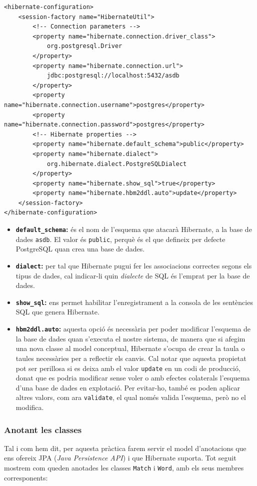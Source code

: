 \begin{verbatim}
<hibernate-configuration>
    <session-factory name="HibernateUtil">
        <!-- Connection parameters -->
        <property name="hibernate.connection.driver_class">
            org.postgresql.Driver
        </property>
        <property name="hibernate.connection.url">
            jdbc:postgresql://localhost:5432/asdb
        </property>
        <property name="hibernate.connection.username">postgres</property>
        <property name="hibernate.connection.password">postgres</property>
        <!-- Hibernate properties -->
        <property name="hibernate.default_schema">public</property>
        <property name="hibernate.dialect">
            org.hibernate.dialect.PostgreSQLDialect
        </property>
        <property name="hibernate.show_sql">true</property>
        <property name="hibernate.hbm2ddl.auto">update</property>
    </session-factory>
</hibernate-configuration>
\end{verbatim}

\begin{itemize}
	\item \textbf{\texttt{default\_schema}:} és el nom de l'esquema que atacarà Hibernate, a la base de dades \texttt{asdb}. El valor és \texttt{public}, perquè és el que defineix per defecte PostgreSQL quan crea una base de dades.
	\item \textbf{\texttt{dialect}:} per tal que Hibernate pugui fer les associacions correctes segons els tipus de dades, cal indicar-li quin \emph{dialecte} de SQL és l'emprat per la base de dades.
	\item \textbf{\texttt{show\_sql}:} ens permet habilitar l'enregistrament a la consola de les sentències SQL que genera Hibernate.
	\item \textbf{\texttt{hbm2ddl.auto}:} aquesta opció és necessària per poder modificar l'esquema de la base de dades quan s'executa el nostre sistema, de manera que si afegim una nova classe al model conceptual, Hibernate s'ocupa de crear la taula o taules necessàries per a reflectir els canvis. Cal notar que aquesta propietat pot ser perillosa si es deixa amb el valor \texttt{update} en un codi de producció, donat que es podria modificar sense voler o amb efectes colaterals l'esquema d'una base de dades en explotació. Per evitar-ho, també es poden aplicar altres valors, com ara \texttt{validate}, el qual només valida l'esquema, però no el modifica.
\end{itemize}

\subsubsection{Anotant les classes}
Tal i com hem dit, per aquesta pràctica farem servir el model d'anotacions que ens ofereix JPA (\emph{Java Persistence API}) i que Hibernate suporta. Tot seguit mostrem com queden anotades les classes \texttt{Match} i \texttt{Word}, amb els seus membres corresponents:

